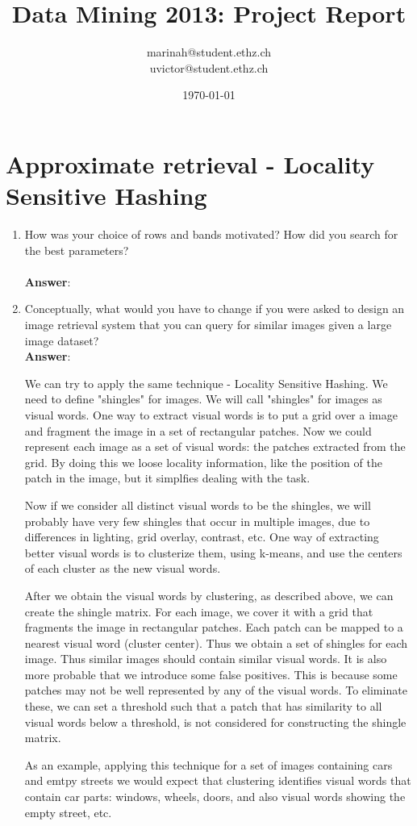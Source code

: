 \documentclass[11pt]{article}
\title{Data Mining 2013: Project Report}
\author{marinah@student.ethz.ch\\ uvictor@student.ethz.ch\\}
\date{\today}
\begin{document}
\maketitle

\section{Approximate retrieval - Locality Sensitive Hashing}
\begin{enumerate}
\item How was your choice of rows and bands motivated? How did you search for the
best parameters? \\ \\
\textbf{Answer}:

\item Conceptually, what would you have to change if you were asked to design an image
  retrieval system that you can query for similar images given a large image
  dataset? \\

\textbf{Answer}:

We can try to apply the same technique - Locality Sensitive Hashing. We need to
define "shingles" for images. We will call "shingles" for images as visual words. One way to extract visual words is to put a grid over a image and fragment the image in a set of rectangular patches. Now we could represent each image as a set of visual words: the patches extracted from the grid. By doing this we loose
locality information, like the position of the patch in the image, but it 
simplfies dealing with the task.

Now if we consider all distinct visual words to be the shingles, we will probably have very few shingles that occur in multiple images, due to differences in lighting, grid overlay, contrast, etc. One way of extracting better visual words is to clusterize them, using k-means, and use the centers of each cluster as the new visual words. 

After we obtain the visual words by clustering, as described above, we can create the shingle matrix. For each image, we cover it with a grid that fragments the image in rectangular patches. Each patch can be mapped to a nearest visual word
(cluster center). Thus we obtain a set of shingles for each image. Thus similar images should contain similar visual words. It is also more probable that we introduce some false positives. This is because some patches may not be well represented by any of the visual words. To eliminate these, we can set a threshold such that a patch that has similarity to all visual words below a threshold, is not considered for constructing the shingle matrix.

As an example, applying this technique for a set of images containing cars and emtpy streets we would expect that clustering identifies visual words that contain car parts: windows, wheels, doors, and also visual words showing the empty street, etc.

\end{enumerate}
\end{document}
